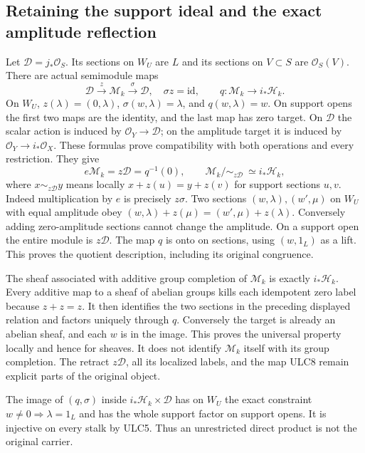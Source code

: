 \documentclass[11pt,a4paper]{article}
\theoremstyle{definition}\newtheorem{definition}[theorem]{Definition}
\begin{document}
\subsection{Retaining the support ideal and the exact amplitude reflection}
Let $\mathcal D=j_*\mathcal O_S$. Its sections on $W_U$ are $L$
and its sections on $V\subset S$ are $\mathcal O_S(V)$.
There are actual semimodule maps
\begin{equation}\tag{ULC9}
 \mathcal D\xrightarrow{z}\mathcal M_k
 \xrightarrow{\sigma}\mathcal D,\quad\sigma z=\mathrm{id},
 \qquad q:\mathcal M_k\longrightarrow i_*\mathcal H_k.
\end{equation}
On $W_U$, $z(\lambda)=(0,\lambda)$, $\sigma(w,\lambda)=\lambda$,
and $q(w,\lambda)=w$. On support opens the first two maps are the
identity, and the last map has zero target. On $\mathcal D$ the
scalar action is induced by $\mathcal O_Y\to\mathcal D$; on the
amplitude target it is induced by $\mathcal O_Y\to i_*\mathcal O_X$.
These formulas prove compatibility with both operations and every
restriction. They give
\begin{equation}\tag{ULC10}
 e\mathcal M_k=z\mathcal D=q^{-1}(0),\qquad
 \mathcal M_k/\!\sim_{z\mathcal D}\ \simeq i_*\mathcal H_k,
\end{equation}
where $x\sim_{z\mathcal D}y$ means locally
$x+z(u)=y+z(v)$ for support sections $u,v$.
Indeed multiplication by $e$ is precisely $z\sigma$. Two sections
$(w,\lambda),(w',\mu)$ on $W_U$ with equal amplitude obey
$(w,\lambda)+z(\mu)=(w',\mu)+z(\lambda)$. Conversely adding
zero-amplitude sections cannot change the amplitude. On a support
open the entire module is $z\mathcal D$. The map $q$ is onto
on sections, using $(w,1_L)$ as a lift. This proves the quotient
description, including its original congruence.

The sheaf associated with additive group completion of $\mathcal M_k$
is exactly $i_*\mathcal H_k$. Every additive map to a sheaf of
abelian groups kills each idempotent zero label because $z+z=z$.
It then identifies the two sections in the preceding displayed
relation and factors uniquely through $q$. Conversely the target
is already an abelian sheaf, and each $w$ is in the image. This
proves the universal property locally and hence for sheaves.
It does not identify $\mathcal M_k$ itself with its group completion.
The retract $z\mathcal D$, all its localized labels, and the map
ULC8 remain explicit parts of the original object.

The image of $(q,\sigma)$ inside
$i_*\mathcal H_k\times\mathcal D$ has on $W_U$ the exact constraint
$w\ne0\Rightarrow\lambda=1_L$ and has the whole support factor
on support opens. It is injective on every stalk by ULC5. Thus an
unrestricted direct product is not the original carrier.
\end{document}
